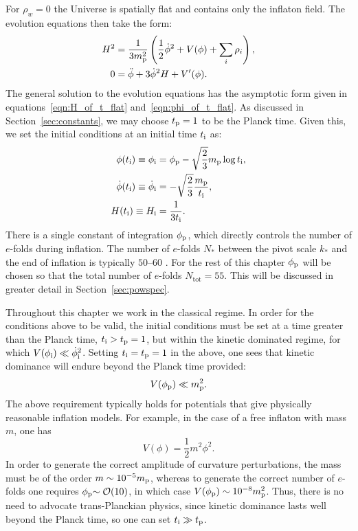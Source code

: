 For $\rho_w=0$ the Universe is spatially flat and contains only the inflaton field. The evolution equations then take the form:
%
\begin{align}
  H^2 
  &= 
  \frac{1}{3m_{\mathrm{p}}^2}
  \left(\frac{1}{2}\dot{\phi}^2 + V(\phi) + \sum_i\rho_i\right),
  \label{eqn:Friedmann_eq} 
  \\
  0
  &= 
  \ddot{\phi} +3\dot{\phi}^2H + V^\prime(\phi).
  \label{eqn:Motion_eq_Scalar}
\end{align}
%
The general solution to the evolution equations has the asymptotic form given in equations~\eqref{eqn:H_of_t_flat} and~\eqref{eqn:phi_of_t_flat}. As discussed in Section~\ref{sec:constants}, we may choose $t_{\mathrm{p}}=1$ to be the Planck time. Given this, we set the initial conditions at an initial time $t_{\mathrm{i}}$ as:
%
\begin{align}
  \phi(t_{\mathrm{i}}) \equiv \phi_{\mathrm{i}}
  &= 
  \phi_{\mathrm{p}} - \sqrt{\frac{2}{3}}m_{\mathrm{p}}\log t_{\mathrm{i}}, 
  \label{eqn:phi_ic}
  \\
  \dot\phi(t_{\mathrm{i}}) 
  \equiv 
  \dot\phi_{\mathrm{i}}
  &= 
  -\sqrt{\frac{2}{3}}\frac{m_{\mathrm{p}}}{t_{\mathrm{i}}}, 
  \label{eqn:phid_ic}
  \\
  H(t_{\mathrm{i}}) 
  \equiv 
  H_{\mathrm{i}}
  &= 
  \frac{1}{3t_{\mathrm{i}}}. 
  \label{eqn:H_ic}
\end{align}
There is a single constant of integration $\phi_{\mathrm{p}}$, which directly controls the number of $e$-folds during inflation. The number of $e$-folds $N_*$ between the pivot scale $k_*$ and the end of inflation is typically $50$--$60$ \citep{planck_collaboration_planck_2013-1}. For the rest of this chapter $\phi_{\mathrm{p}}$ will be chosen so that the total number of $e$-folds $N_\mathrm{tot}=55$. This will be discussed in greater detail in Section~\ref{sec:powspec}.

Throughout this chapter we work in the classical regime. In order for the conditions above to be valid, the initial conditions must be set at a time greater than the Planck time, $t_{\mathrm{i}} >t_{\mathrm{p}}=1$, but within the kinetic dominated regime, for which $V(\phi_{\mathrm{i}}) \ll \dot\phi_{\mathrm{i}}^2$. Setting $t_{\mathrm{i}}=t_{\mathrm{p}}=1$ in the above, one sees that kinetic dominance will endure beyond the Planck time provided:
%
\begin{equation}
  V(\phi_{\mathrm{p}}) \ll m_{\mathrm{p}}^2.
\end{equation}
%
The above requirement typically holds for potentials that give physically reasonable inflation models. For example, in the case of a free inflaton with mass $m$, one has \[ V(\phi) = \frac{1}{2}m^2 \phi^2.\] In order to generate the correct amplitude of curvature perturbations, the mass must be of the order $m\sim10^{-5}m_{\mathrm{p}}$, whereas to generate the correct number of $e$-folds one requires $\phi_{\mathrm{p}}{\sim\mathcal{O}{\left(10\right)}}$, in which case $V(\phi_{\mathrm{p}}) \sim 10^{-8} m_{\mathrm{p}}^2$.  Thus, there is no need to advocate trans-Planckian physics, since kinetic dominance lasts well beyond the Planck time, so one can set $t_{\mathrm{i}} \gg t_{\mathrm{p}}$.


